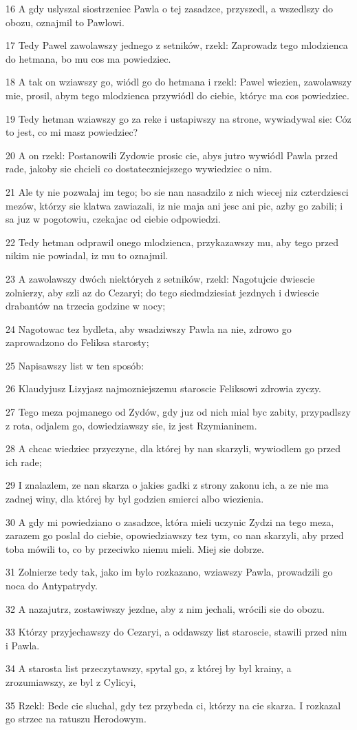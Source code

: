 \par 16 A gdy uslyszal siostrzeniec Pawla o tej zasadzce, przyszedl, a wszedlszy do obozu, oznajmil to Pawlowi.
\par 17 Tedy Pawel zawolawszy jednego z setników, rzekl: Zaprowadz tego mlodzienca do hetmana, bo mu cos ma powiedziec.
\par 18 A tak on wziawszy go, wiódl go do hetmana i rzekl: Pawel wiezien, zawolawszy mie, prosil, abym tego mlodzienca przywiódl do ciebie, któryc ma cos powiedziec.
\par 19 Tedy hetman wziawszy go za reke i ustapiwszy na strone, wywiadywal sie: Cóz to jest, co mi masz powiedziec?
\par 20 A on rzekl: Postanowili Zydowie prosic cie, abys jutro wywiódl Pawla przed rade, jakoby sie chcieli co dostateczniejszego wywiedziec o nim.
\par 21 Ale ty nie pozwalaj im tego; bo sie nan nasadzilo z nich wiecej niz czterdziesci mezów, którzy sie klatwa zawiazali, iz nie maja ani jesc ani pic, azby go zabili; i sa juz w pogotowiu, czekajac od ciebie odpowiedzi.
\par 22 Tedy hetman odprawil onego mlodzienca, przykazawszy mu, aby tego przed nikim nie powiadal, iz mu to oznajmil.
\par 23 A zawolawszy dwóch niektórych z setników, rzekl: Nagotujcie dwiescie zolnierzy, aby szli az do Cezaryi; do tego siedmdziesiat jezdnych i dwiescie drabantów na trzecia godzine w nocy;
\par 24 Nagotowac tez bydleta, aby wsadziwszy Pawla na nie, zdrowo go zaprowadzono do Feliksa starosty;
\par 25 Napisawszy list w ten sposób:
\par 26 Klaudyjusz Lizyjasz najmozniejszemu staroscie Feliksowi zdrowia zyczy.
\par 27 Tego meza pojmanego od Zydów, gdy juz od nich mial byc zabity, przypadlszy z rota, odjalem go, dowiedziawszy sie, iz jest Rzymianinem.
\par 28 A chcac wiedziec przyczyne, dla której by nan skarzyli, wywiodlem go przed ich rade;
\par 29 I znalazlem, ze nan skarza o jakies gadki z strony zakonu ich, a ze nie ma zadnej winy, dla której by byl godzien smierci albo wiezienia.
\par 30 A gdy mi powiedziano o zasadzce, która mieli uczynic Zydzi na tego meza, zarazem go poslal do ciebie, opowiedziawszy tez tym, co nan skarzyli, aby przed toba mówili to, co by przeciwko niemu mieli. Miej sie dobrze.
\par 31 Zolnierze tedy tak, jako im bylo rozkazano, wziawszy Pawla, prowadzili go noca do Antypatrydy.
\par 32 A nazajutrz, zostawiwszy jezdne, aby z nim jechali, wrócili sie do obozu.
\par 33 Którzy przyjechawszy do Cezaryi, a oddawszy list staroscie, stawili przed nim i Pawla.
\par 34 A starosta list przeczytawszy, spytal go, z której by byl krainy, a zrozumiawszy, ze byl z Cylicyi,
\par 35 Rzekl: Bede cie sluchal, gdy tez przybeda ci, którzy na cie skarza. I rozkazal go strzec na ratuszu Herodowym.

